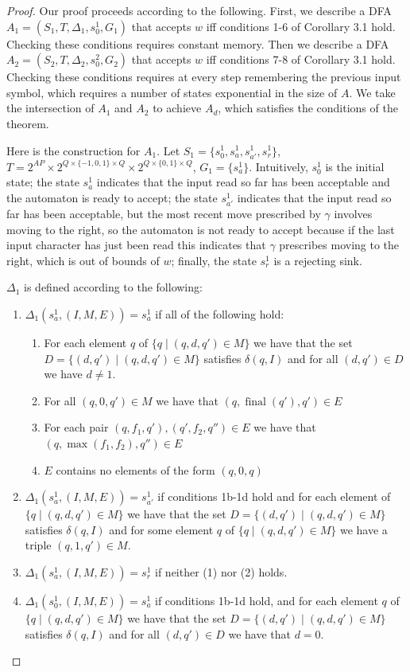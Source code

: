 \documentclass[10pt,a4paper]{amsart}
\theoremstyle{plain}
\theoremstyle{definition}
\theoremstyle{definition}
\DeclareMathOperator{\?}{?}
\DeclareMathOperator{\final}{final}
\begin{document}
\begin{proof}
  Our proof proceeds according to the following. First, we describe a DFA $A_1 = (S_1, T, \Delta_1, s^1_0, G_1)$ that accepts $w$ iff conditions 1-6 of Corollary 3.1 hold. Checking these conditions requires constant memory. Then we describe a DFA $A_2 = (S_2, T, \Delta_2, s^2_0, G_2)$ that accepts $w$ iff conditions 7-8 of Corollary 3.1 hold. Checking these conditions requires at every step remembering the previous input symbol, which requires a number of states exponential in the size of $A$. We take the intersection of $A_1$ and $A_2$ to achieve $A_d$, which satisfies the conditions of the theorem.

Here is the construction for $A_1$. Let $S_1 = \{s^1_0,s^1_a,s^1_{a'},s^1_r\}$, $T = 2^{AP} \times 2^{Q \times \{-1,0,1\} \times Q} \times 2^{Q \times \{0,1\} \times Q}$, $G_1 = \{s^1_a\}$. Intuitively, $s^1_0$ is the initial state; the state $s^1_a$ indicates that the input read so far has been acceptable and the automaton is ready to accept; the state $s^1_{a'}$ indicates that the input read so far has been acceptable, but the most recent move prescribed by $\gamma$ involves moving to the right, so the automaton is not ready to accept because if the last input character has just been read this indicates that $\gamma$ prescribes moving to the right, which is out of bounds of $w$; finally, the state $s^1_r$ is a rejecting sink.

$\Delta_1$ is defined according to the following:
\begin{enumerate}
\item $\Delta_1(s^1_a,(I,M,E)) = s^1_a$ if all of the following hold:
\begin{enumerate}
    \item For each element $q$ of $\{q \mid (q,d,q') \in M\}$ we have that the set $D=\{(d,q') \mid (q,d,q') \in M\}$ satisfies $\delta(q,I)$ and
    for all $(d,q')\in D$ we have $d \neq 1$.
    \item For all $(q,0,q') \in M$ we have that $(q,\final(q'),q') \in E$
    \item For each pair $(q,f_1,q'),(q',f_2,q'') \in E$ we have that $(q,\max(f_1,f_2),q'') \in E$
    \item $E$ contains no elements of the form $(q,0,q)$
\end{enumerate}
\item $\Delta_1(s^1_a,(I,M,E)) = s^1_{a'}$ if conditions 1b-1d hold and for each element of $\{q \mid (q,d,q') \in M\}$ we have that the set $D = \{(d,q') \mid (q,d,q') \in M\}$ satisfies $\delta(q,I)$ and for some element $q$ of $\{q \mid (q,d,q') \in M\}$ we have a triple $(q,1,q')\in M$.
\item $\Delta_1(s^1_a,(I,M,E)) = s^1_r$ if neither (1) nor (2) holds.
\item $\Delta_1(s^1_0,(I,M,E)) = s^1_a$ if conditions 1b-1d hold, and for each element $q$ of $\{q \mid (q,d,q') \in M\}$ we have that the set $D = \{(d,q') \mid (q,d,q') \in M\}$ satisfies $\delta(q,I)$ and for all $(d,q') \in D$ we have that $d = 0$.


\end{enumerate}
\end{proof}
\end{document}
